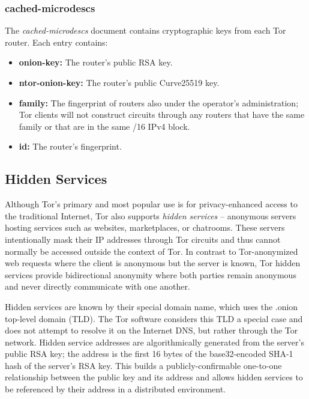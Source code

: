 \subsubsection{cached-microdescs}

The \emph{cached-microdescs} document contains cryptographic keys from each Tor router. Each entry contains:

\begin{itemize}
	\item \textbf{onion-key:} The router's public RSA key.
	\item \textbf{ntor-onion-key:} The router's public Curve25519 key.
	\item \textbf{family:} The fingerprint of routers also under the operator's administration; Tor clients will not construct circuits through any routers that have the same family or that are in the same /16 IPv4 block.
	\item \textbf{id:} The router's fingerprint.
\end{itemize}

\subsection{Hidden Services}
\label{sec:HiddenServices}

Although Tor's primary and most popular use is for privacy-enhanced access to the traditional Internet, Tor also supports \emph{hidden services} -- anonymous servers hosting services such as websites, marketplaces, or chatrooms. These servers intentionally mask their IP addresses through Tor circuits and thus cannot normally be accessed outside the context of Tor. In contrast to Tor-anonymized web requests where the client is anonymous but the server is known, Tor hidden services provide bidirectional anonymity where both parties remain anonymous and never directly communicate with one another\cite{nicolussi2011human}.

Hidden services are known by their special domain name, which uses the .onion top-level domain (TLD). The Tor software considers this TLD a special case and does not attempt to resolve it on the Internet DNS, but rather through the Tor network. Hidden service addresses are algorithmically generated from the server's public RSA key; the address is the first 16 bytes of the base32-encoded SHA-1 hash of the server's RSA key. This builds a publicly-confirmable one-to-one relationship between the public key and its address and allows hidden services to be referenced by their address in a distributed environment.

